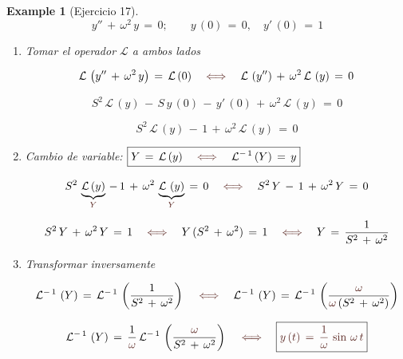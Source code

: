 \documentclass[a4paper,11pt,openany]{book}
\newtheorem{exmp}{Example}[section]
\newcommand*{\itembolasazules}[1]{%
\footnotesize\protect\tikz[baseline=-3pt]%
\protect\node[scale=.7, circle, shade, ball
color=green]{\color{white}\Large\bf#1};}
\begin{document}
\begin{exmp}[Ejercicio 17]

$$y''\,+\,\omega^{2}\,y\,=\,0; \qquad y\,(0)\,=\,0, \quad y'\,(0)\,=\,1$$
 
\begin{enumerate}[label=\itembolasazules{\arabic*}]
 
 
\item Tomar el operador $\mathcal{L}$ a ambos lados
 
$$\mathcal{L}\,\left(y''\,+\,\omega^{2}\,y \right)\,=\,\mathcal{L}\,(0) \quad \textcolor{caputmortuum}{\iff} \quad \mathcal{L}\,\left(y'' \right)\,+\,\omega^{2}\,\mathcal{L}\,\left(y \right)\,=\,0$$
 
$$S^{2}\,\mathcal{L}\,(y)\,-\,S\,y\,(0)\,-\,y'\,(0)\,+\,\omega^{2}\,\mathcal{L}\,\left(y \right)\,=\,0$$
 
$$S^{2}\,\mathcal{L}\,(y)\,-\,1\,+\,\omega^{2}\,\mathcal{L}\,\left(y \right)\,=\,0$$
 
\item Cambio de variable: $\boxed{Y\,=\,\mathcal{L}\,(y) \quad \textcolor{caputmortuum}{\iff} \quad \mathcal{L}^{-\,1}\,(Y)\,=\,y  }$
 
$$S^{2}\,\underbrace{\mathcal{L}\,(y)}_{\textcolor{caputmortuum}{Y} }\,-\,1\,+\,\omega^{2}\,\underbrace{\mathcal{L}\,\left(y \right)}_{\textcolor{caputmortuum}{Y} }\,=\,0 \quad \textcolor{caputmortuum}{\iff} \quad S^{2}\,Y\,-\,1\,+\,\omega^{2}\,Y\,=\,0$$
 
$$S^{2}\,Y\,+\,\omega^{2}\,Y\,=\,1 \quad \textcolor{caputmortuum}{\iff} \quad Y\,(S^{2}\,+\,\omega^{2})\,=\,1 \quad \textcolor{caputmortuum}{\iff} \quad Y\,=\,\dfrac{1}{S^{2}\,+\,\omega^{2}}$$
 
\item Transformar inversamente 
 
$$\mathcal{L}^{-\,1}\,\left(Y \right)\,=\,\mathcal{L}^{-\,1}\,\left(\dfrac{1}{S^{2}\,+\,\omega^{2}} \right) \quad \textcolor{caputmortuum}{\iff} \quad \mathcal{L}^{-\,1}\,\left(Y \right)\,=\,\mathcal{L}^{-\,1}\,\left(\dfrac{\textcolor{caputmortuum}{\omega} }{\textcolor{caputmortuum}{\omega}\,(S^{2}\,+\,\omega^{2})} \right) $$
 
$$\mathcal{L}^{-\,1}\,\left(Y \right)\,=\,\dfrac{1}{\textcolor{caputmortuum}{\omega}}\,\mathcal{L}^{-\,1}\,\left(\dfrac{\textcolor{caputmortuum}{\omega} }{S^{2}\,+\,\omega^{2}} \right) \quad \textcolor{caputmortuum}{\iff} \quad \boxed{\textcolor{caputmortuum}{y\,(t)\,=\,\dfrac{1}{\omega}\,\sin\,\omega\,t }  }$$
 
\end{enumerate}

\end{exmp}
 
\end{document}
